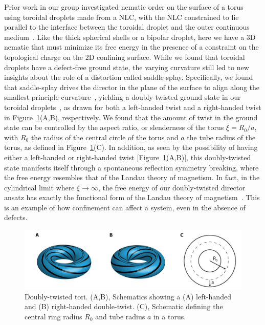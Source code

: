 Prior work in our group investigated nematic order on the surface of a torus using toroidal droplets made from a NLC, with the NLC constrained to lie parallel to the interface between the toroidal droplet and the outer continuous medium~\cite{RN46,RN47}.
Like the thick spherical shells or a bipolar droplet, here we have a 3D nematic that must minimize its free energy in the presence of a constraint on the topological charge on the 2D confining surface.
While we found that toroidal droplets have a defect-free ground state, the varying curvature still led to new insights about the role of a distortion called saddle-splay.
Specifically, we found that saddle-splay drives the director in the plane of the surface to align along the smallest principle curvature~\cite{RN59}, yielding a doubly-twisted ground state in our toroidal droplets~\cite{RN46}, as drawn for both a left-handed twist and a right-handed twist in Figure~\ref{f:1-Torus}(A,B), respectively.
We found that the amount of twist in the ground state can be controlled by the aspect ratio, or slenderness of the torus $\xi = R_0/a$, with $R_0$ the radius of the central circle of the torus and $a$ the tube radius of the torus, as defined in Figure~\ref{f:1-Torus}(C).
In addition, as seen by the possibility of having either a left-handed or right-handed twist [Figure~\ref{f:1-Torus}(A,B)], this doubly-twisted state manifests itself through a spontaneous reflection symmetry breaking, where the free energy resembles that of the Landau theory of magnetism.
In fact, in the cylindrical limit where $\xi \rightarrow \infty$, the free energy of our doubly-twisted director ansatz has exactly the functional form of the Landau theory of magnetism~\cite{RN293}.
This is an example of how confinement can affect a system, even in the absence of defects.
\begin{figure}
  \centering
  \includegraphics{figures/C1/Ch1-Figs_Torus.png}
  \caption{Doubly-twisted tori.
  (A,B), Schematics showing a (A) left-handed and (B) right-handed double-twist.
  (C), Schematic defining the central ring radius $R_0$ and tube radius $a$ in a torus.}\label{f:1-Torus}
\end{figure}

